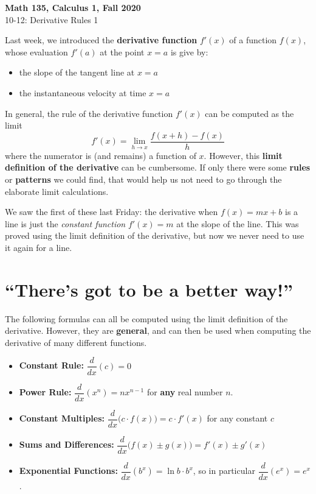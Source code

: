\documentclass[11pt,reqno,final]{amsart}
\numberwithin{figure}{section}
\theoremstyle{definition} %
\newcommand{\dlim}{\displaystyle\lim}
\begin{document}
\begin{center}
        \textbf{\Large Math 135, Calculus 1, Fall 2020}\\[10pt]
        {\large 10-12: Derivative Rules 1}
\end{center}

\thispagestyle{empty}


\renewcommand{\thesection}{\Alph{section}}


Last week, we introduced the \textbf{derivative function} $f'(x)$ of a function $f(x)$, whose evaluation $f'(a)$ at the point $x=a$ is give by:
\begin{itemize}
\item the slope of the tangent line at $x=a$
\item the instantaneous velocity at time $x = a$
\end{itemize}

In general, the rule of the derivative function $f'(x)$ can be computed as the limit
\[
        f'(x) = \dlim_{h \to x} \dfrac{f(x+h) - f(x)}{h}
\]
where the numerator is (and remains) a function of $x$.
However, this \textbf{limit definition of the derivative} can be cumbersome.
If only there were some \textbf{rules} or \textbf{patterns} we could find, that would help us not need to go through the elaborate limit calculations.

We saw the first of these last Friday: the derivative when $f(x) = mx + b$ is a line is just the \textit{constant function} $f'(x) = m$ at the slope of the line.
This was proved using the limit definition of the derivative, but now we never need to use it again for a line.

\section{``There's got to be a better way!''}

The following formulas can all be computed using the limit definition of the derivative.
However, they are \textbf{general}, and can then be used when computing the derivative of many different functions.

\begin{itemize}\itemsep+15pt
\item \textbf{Constant Rule:} $\dfrac{d}{dx}(c) = 0$
\item \textbf{Power Rule:} $\dfrac{d}{dx}(x^n) = nx^{n-1}$ for \textbf{any} real number $n$.
\item \textbf{Constant Multiples:} $\dfrac{d}{dx}\big(c \cdot f(x)\big) = c \cdot f'(x)$ for any constant $c$
\item \textbf{Sums and Differences:} $\dfrac{d}{dx}\big( f(x) \pm g(x) \big) = f'(x) \pm g'(x)$
\item \textbf{Exponential Functions:} $\dfrac{d}{dx}(b^x) = \ln b \cdot b^x$, so in particular $\dfrac{d}{dx}(e^x) = e^x$.
\end{itemize}
\end{document}
